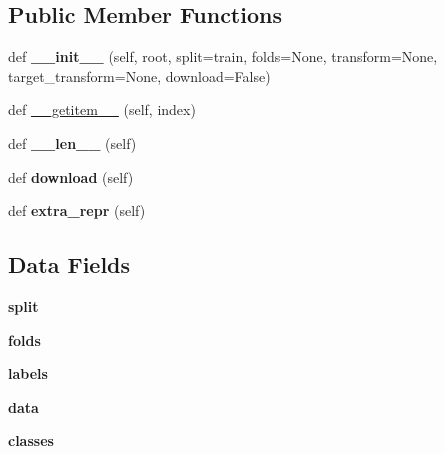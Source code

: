 \subsection*{Public Member Functions}
\begin{DoxyCompactItemize}
\item 
\mbox{\label{classtorchvision_1_1datasets_1_1stl10_1_1STL10_a007ad6346a9a671981594314f5f86976}} 
def {\bfseries \+\_\+\+\_\+init\+\_\+\+\_\+} (self, root, split=\textquotesingle{}train\textquotesingle{}, folds=None, transform=None, target\+\_\+transform=None, download=False)
\item 
def \hyperlink{classtorchvision_1_1datasets_1_1stl10_1_1STL10_a70217a5d4cc4dbfb7b4be1f200673b82}{\+\_\+\+\_\+getitem\+\_\+\+\_\+} (self, index)
\item 
\mbox{\label{classtorchvision_1_1datasets_1_1stl10_1_1STL10_a47b8e6b7f7c83991971fa7df6e30ab68}} 
def {\bfseries \+\_\+\+\_\+len\+\_\+\+\_\+} (self)
\item 
\mbox{\label{classtorchvision_1_1datasets_1_1stl10_1_1STL10_a3c861fb944e38a39a464dc91daf98fe6}} 
def {\bfseries download} (self)
\item 
\mbox{\label{classtorchvision_1_1datasets_1_1stl10_1_1STL10_acb5491351118b5eb0f5d1a072ca08b78}} 
def {\bfseries extra\+\_\+repr} (self)
\end{DoxyCompactItemize}
\subsection*{Data Fields}
\begin{DoxyCompactItemize}
\item 
\mbox{\label{classtorchvision_1_1datasets_1_1stl10_1_1STL10_aa24134f53e6884b3c928260240a1e8a8}} 
{\bfseries split}
\item 
\mbox{\label{classtorchvision_1_1datasets_1_1stl10_1_1STL10_a6f7808401c8334135393544568a8934e}} 
{\bfseries folds}
\item 
\mbox{\label{classtorchvision_1_1datasets_1_1stl10_1_1STL10_a3d0312f0ad7271d15599aab88ad2dab9}} 
{\bfseries labels}
\item 
\mbox{\label{classtorchvision_1_1datasets_1_1stl10_1_1STL10_ac56d85f1359073e3e8ce201092b5e9fc}} 
{\bfseries data}
\item 
\mbox{\label{classtorchvision_1_1datasets_1_1stl10_1_1STL10_a0c5b22a8caf16fb6e6e4419c39c88a08}} 
{\bfseries classes}
\end{DoxyCompactItemize}
